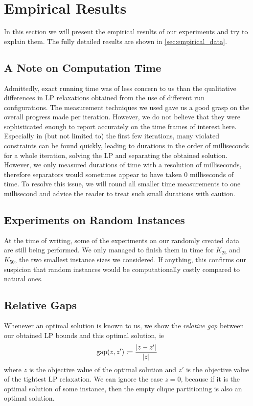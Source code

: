 \section{Empirical Results}\label{sec:empirical_results}
In this section we will present the empirical results of our experiments and try to explain them.
The fully detailed results are shown in \cref{sec:empirical_data}.

\subsection{A Note on Computation Time}\label{subsec:note_computation_time}
Admittedly, exact running time was of less concern to us than the qualitative differences in LP relaxations obtained from the use of different run configurations.
The measurement techniques we used gave us a good grasp on the overall progress made per iteration.
However, we do not believe that they were sophisticated enough to report accurately on the time frames of interest here.
Especially in (but not limited to) the first few iterations, many violated constraints can be found quickly,
leading to durations in the order of milliseconds for a whole iteration, \ie solving the LP and separating the obtained solution.
However, we only measured durations of time with a resolution of milliseconds, therefore separators would sometimes appear to have taken 0 milliseconds of time.
To resolve this issue, we will round all smaller time measurements to one millisecond and advice the reader to treat such small durations with caution.

\subsection{Experiments on Random Instances}\label{subsec:random_experiments}
At the time of writing, some of the experiments on our randomly created data are still being performed.
We only managed to finish them in time for $K_{25}$ and $K_{50}$, the two smallest instance sizes we considered.
If anything, this confirms our suspicion that random instances would be computationally costly compared to natural ones.

\subsection{Relative Gaps}\label{subsec:gaps}
Whenever an optimal solution is known to us, we show the \textit{relative gap} between our obtained LP bounds and this optimal solution, ie
\[
	\operatorname{\text{gap}}(z, z') \coloneqq \frac{\lvert z - z' \rvert}{\lvert z \rvert}
\]
where $z$ is the objective value of the optimal solution and $z'$ is the objective value of the tightest LP relaxation.
We can ignore the case $z = 0$, because if it is the optimal solution of some instance, then the empty clique partitioning is also an optimal solution.

